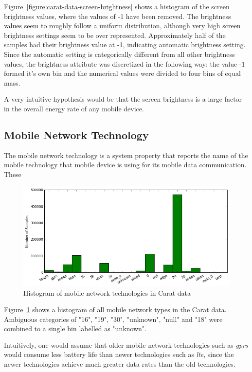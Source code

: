 Figure~\ref{figure:carat-data-screen-brightness} shows a histogram of the screen brightness values, where the values of -1 have been removed. The brightness values seem to roughly follow a uniform distribution, although very high screen brightness settings seem to be over represented. Approximately half of the samples had their brightness value at -1, indicating automatic brightness setting. Since the automatic setting is categorically different from all other brightness values, the brightness attribute was discretized in the following way: the value -1 formed it's own bin and the numerical values were divided to four bins of equal mass.   

A very intuitive hypothesis would be that the screen brightness is a large factor in the overall energy rate of any mobile device.

\subsection{Mobile Network Technology}  

The mobile network technology is a system property that reports the name of the mobile technology that mobile device is using for its mobile data communication. These 

\begin{figure} %
	\centering
	\includegraphics[width=\textwidth]{images/carat-data/mobile_net_type.png}
	\caption{Histogram of mobile network technologies in Carat data}
	\label{figure:carat-data-mobile-net-type}
\end{figure}   

Figure~\ref{figure:carat-data-mobile-net-type} shows a histogram of all mobile network types in the Carat data. Ambiguous categories of "16", "19", "30", "unknown", "null" and "18" were combined to a single bin labelled as "unknown".

Intuitively, one would assume that older mobile network technologies such as \textit{gprs} would consume less battery life than newer technologies such as \textit{lte}, since the newer technologies achieve much greater data rates than the old technologies.

